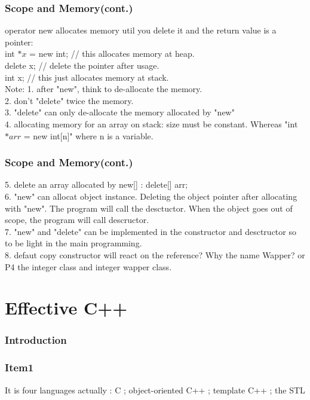 \documentclass{beamer}
\begin{document}
\begin{frame}
\frametitle{Scope and Memory(cont.)}
operator new allocates memory util you delete it and the return value is a pointer: \\

int $\ast x$ = new int; // this allocates memory at heap.\\
delete x;         // delete the pointer after usage. \\

int x; // this just allocates memory at stack. \\

Note: 1. after "new", think to de-allocate the memory.\\
	  2. don't "delete" twice the memory. \\
	  3. "delete" can only de-allocate the memory allocated by "new" \\
	  4. allocating memory for an array on stack: size must be constant. Whereas "int $\ast arr$ = new int[n]" where n is a variable. \\
	
	   
\end{frame}
\begin{frame}
\frametitle{Scope and Memory(cont.)}
	  5. delete an array allocated by new[] : delete[] arr;\\
	  6. "new" can allocat object instance. Deleting the object pointer after allocating with "new". The program will call the desctuctor. When the object goes out of scope, the program will call descructor.\\
	  7. "new" and "delete" can be implemented in the constructor and desctructor so to be light in the main programming.\\
	  8. defaut copy constructor will react on the reference? Why the name Wapper? or P4 the integer class and integer wapper class.
\end{frame}
\section{Effective C++}
\begin{frame}
\frametitle{Introduction}

\end{frame}

\begin{frame}
\frametitle{Item1}
It is four languages actually : C ; object-oriented C++ ; template C++ ; the STL
\end{frame}
\end{document}
